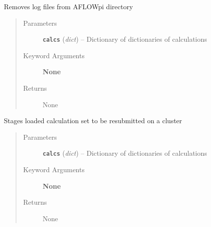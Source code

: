 \documentclass[letterpaper,10pt,english]{sphinxmanual}
\begin{document}

\begin{fulllineitems}
\label{run:run.reset_logs}
Removes log files from AFLOWpi directory
\begin{quote}\begin{description}
\item[{Parameters}] \leavevmode
\textbf{\texttt{calcs}} (\emph{dict}) -- Dictionary of dictionaries of calculations

\item[{Keyword Arguments}] \leavevmode
\textbf{None}

\item[{Returns}] \leavevmode
None

\end{description}\end{quote}

\end{fulllineitems}


\begin{fulllineitems}
\label{run:run.resubmit}
Stages loaded calculation set to be resubmitted on a cluster
\begin{quote}\begin{description}
\item[{Parameters}] \leavevmode
\textbf{\texttt{calcs}} (\emph{dict}) -- Dictionary of dictionaries of calculations

\item[{Keyword Arguments}] \leavevmode
\textbf{None}

\item[{Returns}] \leavevmode
None

\end{description}\end{quote}

\end{fulllineitems}

\end{document}
